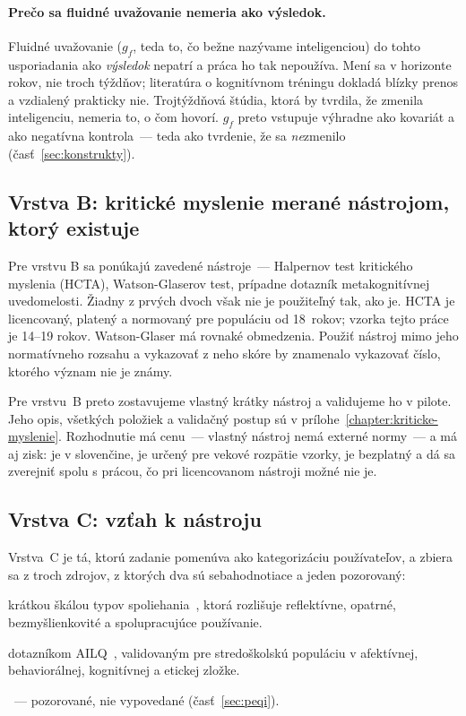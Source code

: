 \paragraph{Prečo sa fluidné uvažovanie nemeria ako výsledok.} Fluidné uvažovanie ($g_f$, teda to, čo bežne nazývame inteligenciou) do tohto usporiadania ako \emph{výsledok} nepatrí a práca ho tak nepoužíva. Mení sa v horizonte rokov, nie troch týždňov; literatúra o kognitívnom tréningu dokladá blízky prenos a vzdialený prakticky nie. Trojtýždňová štúdia, ktorá by tvrdila, že zmenila inteligenciu, nemeria to, o čom hovorí. $g_f$ preto vstupuje výhradne ako kovariát a ako negatívna kontrola~--- teda ako tvrdenie, že sa \emph{ne}zmenilo (časť~\ref{sec:konstrukty}).

\subsection{Vrstva B: kritické myslenie merané nástrojom, ktorý existuje}

Pre vrstvu B sa ponúkajú zavedené nástroje~--- Halpernov test kritického myslenia (HCTA), Watson\--Glaserov test, prípadne dotazník metakognitívnej uvedomelosti. Žiadny z prvých dvoch však nie je použiteľný tak, ako je. HCTA je licencovaný, platený a normovaný pre populáciu od 18~rokov; vzorka tejto práce je 14--19 rokov. Watson\--Glaser má rovnaké obmedzenia. Použiť nástroj mimo jeho normatívneho rozsahu a vykazovať z neho skóre by znamenalo vykazovať číslo, ktorého význam nie je známy.

Pre vrstvu~B preto zostavujeme vlastný krátky nástroj a validujeme ho v pilote. Jeho opis, všetkých \ctItems{} položiek a validačný postup sú v prílohe~\ref{chapter:kriticke-myslenie}. Rozhodnutie má cenu~--- vlastný nástroj nemá externé normy~--- a má aj zisk: je v slovenčine, je určený pre vekové rozpätie vzorky, je bezplatný a dá sa zverejniť spolu s prácou, čo pri licencovanom nástroji možné nie je.

\subsection{Vrstva C: vzťah k nástroju}

Vrstva~C je tá, ktorú zadanie pomenúva ako kategorizáciu používateľov, a zbiera sa z troch zdrojov, z ktorých dva sú sebahodnotiace a jeden pozorovaný:

\begin{description}[leftmargin=0.6cm, nosep]
    \item[\textbf{Spoliehanie sa na nástroj}] krátkou škálou typov spoliehania~\cite{hou2025reliance}, ktorá rozlišuje reflektívne, opatrné, bezmyšlienkovité a spolupracujúce používanie.
    \item[\textbf{Gramotnosť v oblasti UI}] dotazníkom AILQ~\cite{ng2024ailiteracy}, validovaným pre stredoškolskú populáciu v afektívnej, behaviorálnej, kognitívnej a etickej zložke.
    \item[\textbf{PEQI a procesné ukazovatele}]~--- pozorované, nie vypovedané (časť~\ref{sec:peqi}).
\end{description}

